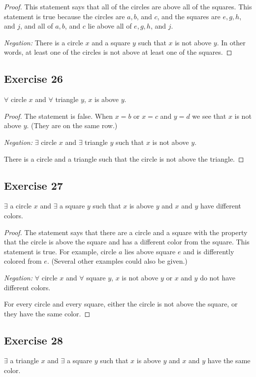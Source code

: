 \documentclass[14pt]{extarticle}
\newcommand{\fa}{\forall}
\newcommand{\te}{\exists}
\begin{document}
\begin{proof}
This statement says that all of the circles are above all of the squares. This statement is true because the circles are $a, b$, and $c$, and the squares are $e, g, h$, and $j$, and all of $a, b$, and $c$ lie above all of $e, g, h$, and $j$.

{\it Negation:} There is a circle $x$ and a square $y$ such that $x$ is not above $y$. In other words, at least one of the circles is not above at least one of the squares.
\end{proof}

\subsection{Exercise 26}
$\fa$ circle $x$ and $\fa$ triangle $y$, $x$ is above $y$.

\begin{proof}
The statement is false. When $x = b$ or $x = c$ and $y = d$ we see that $x$ is not above $y$. (They are on the same row.)

{\it Negation:} $\te$ circle $x$ and $\te$ triangle $y$ such that $x$ is not above $y$.

There is a circle and a triangle such that the circle is not above the triangle.
\end{proof}

\subsection{Exercise 27}
$\te$ a circle $x$ and $\te$ a square $y$ such that $x$ is above $y$ and $x$ and $y$ have different colors.

\begin{proof}
The statement says that there are a circle and a square with the property that the circle is above the square and has a different color from the square. This statement is true. For example, circle $a$ lies above square $e$ and is differently colored from $e$. (Several other examples could
also be given.)

{\it Negation:} $\fa$ circle $x$ and $\fa$ square $y$, $x$ is not above $y$ or $x$ and $y$ do not have different colors.

For every circle and every square, either the circle is not above the square, or they have the same color.
\end{proof}

\subsection{Exercise 28}
$\te$ a triangle $x$ and $\te$ a square $y$ such that $x$ is above $y$ and $x$ and $y$ have the same color.
\end{document}
